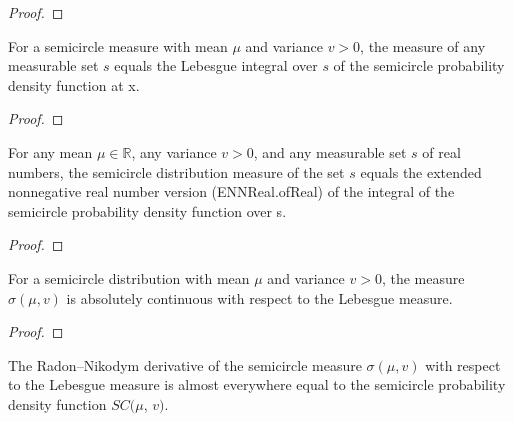 \begin{proof}
  \leanok
\end{proof}

\begin{lemma}
    \label{lemma:semicircleReal_apply}
    \leanok
    For a semicircle measure with mean $\mu$ and variance $v > 0$, the measure of any measurable set $s$ equals the Lebesgue integral over $s$ of the semicircle probability density function at x.
\end{lemma}

\begin{proof}
  \leanok
\end{proof}

\begin{lemma}
    \label{lemma:semicircleReal_apply_eq_integral}
    \leanok
    For any mean $\mu \in \mathbb{R}$, any variance $v > 0$, and any measurable set $s$ of real numbers, the semicircle distribution measure of the set $s$ equals the extended nonnegative real number version (ENNReal.ofReal) of the integral of the semicircle probability density function over s.
\end{lemma}

\begin{proof}
  \leanok
\end{proof}

\begin{lemma}
    \label{lemma:semicircleReal_absolutelyContinuous}
    \leanok
    For a semicircle distribution with mean $\mu$ and variance $v > 0$, the measure $\sigma(\mu, v)$ is absolutely continuous with respect to the Lebesgue measure.
\end{lemma}

\begin{proof}
  \leanok
\end{proof}

\begin{lemma}
    \label{lemma:rnDeriv_semicircleReal}
    \leanok
    The Radon–Nikodym derivative of the semicircle measure $\sigma(\mu, v)$ with respect to the Lebesgue measure is almost everywhere equal to the semicircle probability density function $SC(\mu$, $v)$.
\end{lemma}

